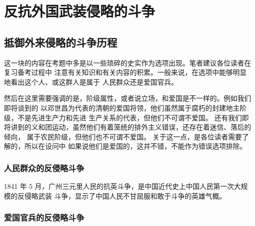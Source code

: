 \documentclass[10pt, UTF8]{book} %
\begin{document}

\section{反抗外国武装侵略的斗争}

\subsection{抵御外来侵略的斗争历程}

这一块的内容在考题中多是以一些琐碎的史实作为选项出现。笔者建议各位读者在复习备考过程中
注意有关知识和有关内容的积累。一般来说，在选项中能够明显地看出这个人、或这群人是属于
人民群众还是爱国官兵。

然后在这里需要强调的是，阶级属性，或者说立场，和爱国是不一样的。例如我们即将谈到的
以邓世昌为代表的清朝的爱国将领，他们虽然属于腐朽的封建地主阶级，不是先进生产力和先进
生产关系的代表，但他们不可谓不爱国。
还有我们即将讲到的义和团运动，虽然他们有着笼统的排外主义错误，还存在着迷信、落后的倾向，
属于农民阶级，但他们也不可谓不爱国。
关于这一点，是各位读者需要了解的，所以在设问中
如果说他们是爱国的，这并不错，不能作为错误选项排除。

\subsubsection{人民群众的反侵略斗争}

1841 年 5 月，广州三元里人民的抗英斗争，是中国近代史上中国人民第一次大规模的反侵略武装
斗争，显示了中国人民不甘屈服和敢于斗争的英雄气概。

\subsubsection{爱国官兵的反侵略斗争}
\end{document}
